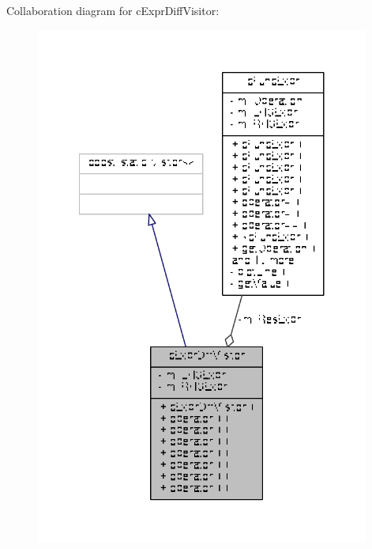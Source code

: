 Collaboration diagram for c\-Expr\-Diff\-Visitor\-:
\nopagebreak
\begin{figure}[H]
\begin{center}
\leavevmode
\includegraphics[width=311pt]{classcExprDiffVisitor__coll__graph}
\end{center}
\end{figure}
